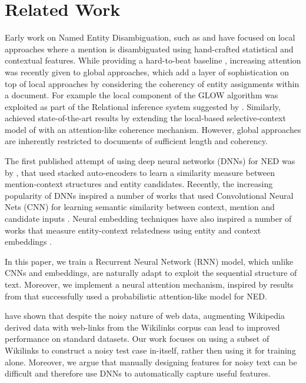 \documentclass[11pt]{article}
\begin{document}
	\section{Related Work}
	
	Early work on Named Entity Disambiguation, such as  and  have focused on local approaches where a mention is disambiguated using hand-crafted statistical and contextual features. While providing a hard-to-beat baseline \cite{Ratinov2011}, increasing attention was recently given to global approaches, which add a layer of sophistication on top of local approaches by considering the coherency of entity assignments within a document. For example the local component of the GLOW algorithm \cite{Ratinov2011} was exploited as part of the Relational inference system suggested by . Similarly,  achieved state-of-the-art results by extending the local-based selective-context model of  with an attention-like coherence mechanism. However, global approaches are inherently restricted to documents of sufficient length and coherency.
	
	The first published attempt of using deep neural networks (DNNs) for NED was by , that used stacked auto-encoders to learn a similarity measure between mention-context structures and entity candidates. Recently, the increasing popularity of DNNs inspired a number of works that used Convolutional Neural Nets (CNN) for learning semantic similarity between context, mention and candidate inputs \cite{sun2015modeling,francis2016capturing}. Neural embedding techniques have also inspired a number of works that measure entity-context relatedness using entity and context embeddings \cite{yamada2016joint,Hu2015Entity}.
	
	In this paper, we train a Recurrent Neural Network (RNN) model, which unlike CNNs and embeddings, are naturally adapt to exploit the sequential structure of text. Moreover, we implement a neural attention mechanism, inspired by results from  that successfully used a probabilistic attention-like model for NED.
	
	 have shown that despite the noisy nature of web data, augmenting Wikipedia derived data with web-links from the Wikilinks corpus \cite{singh12:wiki-links} can lead to improved performance on standard datasets. Our work focuses on using a subset of Wikilinks to construct a noisy test case in-itself, rather then using it for training alone. Moreover, we argue that manually designing features for noisy text can be difficult and therefore use DNNs to automatically capture useful features.
	
\end{document}
